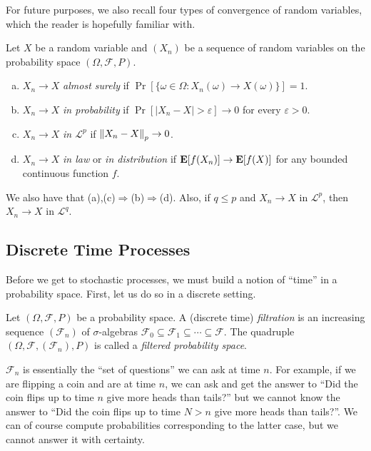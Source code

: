For future purposes, we also recall four types of convergence of random variables, which the reader is hopefully familiar with.
\begin{definition}
	Let $X$ be a random variable and $(X_n)$ be a sequence of random variables on the probability space $(\Omega,\mathcal{F},P)$.
	\begin{enumerate}[(a)]
		\item $X_n\to X$ \textit{almost surely} if $\Pr[\{\omega\in\Omega : X_n(\omega)\to X(\omega)\}]=1$.
		\item $X_n\to X$ \textit{in probability} if $\Pr[|X_n-X|>\varepsilon]\to 0$ for every $\varepsilon>0$.
		\item $X_n\to X$ \textit{in $\mathcal{L}^p$} if $\left\lVert X_n-X\right\rVert_p\to 0$.
		\item $X_n\to X$ \textit{in law} or \textit{in distribution} if $\textbf{E}[f(X_n)]\to\textbf{E}[f(X)]$ for any bounded continuous function $f$. 
 	\end{enumerate}
\end{definition}

We also have that (a),(c)$\Rightarrow$(b)$\Rightarrow$(d). Also, if $q\leq p$ and $X_n\to X$ in $\mathcal{L}^p$, then $X_n\to X$ in $\mathcal{L}^q$.

\subsection{Discrete Time Processes}

Before we get to stochastic processes, we must build a notion of ``time'' in a probability space. First, let us do so in a discrete setting.

\begin{definition}
	Let $(\Omega,\mathcal{F},P)$ be a probability space. A (discrete time) \textit{filtration} is an increasing sequence $(\mathcal{F}_n)$ of $\sigma$-algebras $\mathcal{F}_0\subseteq\mathcal{F}_1\subseteq\cdots\subseteq\mathcal{F}$. The quadruple $(\Omega,\mathcal{F},(\mathcal{F}_n),P)$ is called a \textit{filtered probability space}.
\end{definition}

$\mathcal{F}_n$ is essentially the ``set of questions'' we can ask at time $n$. For example, if we are flipping a coin and are at time $n$, we can ask and get the answer to ``Did the coin flips up to time $n$ give more heads than tails?'' but we cannot know the answer to ``Did the coin flips up to time $N>n$ give more heads than tails?''. We can of course compute probabilities corresponding to the latter case, but we cannot answer it with certainty.


